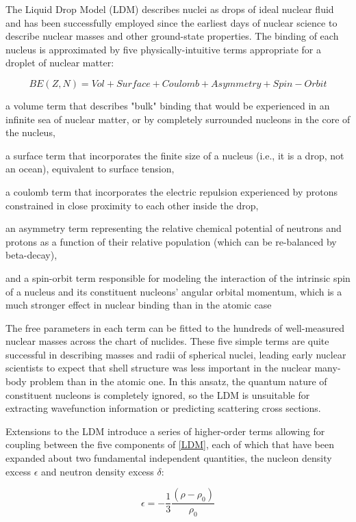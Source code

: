 The Liquid Drop Model (LDM) describes nuclei as drops of ideal nuclear fluid and
has been successfully employed since the earliest days of nuclear science to
describe nuclear masses and other ground-state properties. The binding of each
nucleus is approximated by five physically-intuitive terms appropriate for
a droplet of nuclear matter:

\begin{equation} \label{LDM}
    BE(Z, N) = Vol + Surface + Coulomb + Asymmetry + Spin-Orbit
\end{equation}

a volume term that describes "bulk" binding that would be experienced in an
infinite sea of nuclear matter, or by completely surrounded nucleons in the core of the nucleus,

a surface term that incorporates the finite size of a nucleus (i.e., it is a
drop, not an ocean), equivalent to surface tension,

a coulomb term that incorporates the electric repulsion experienced by protons
constrained in close proximity to each other inside the drop,

an asymmetry term representing the relative chemical potential of neutrons and
protons as a function of their relative population (which can be re-balanced by
beta-decay),

and a spin-orbit term responsible for modeling the interaction of the intrinsic spin
of a nucleus and its constituent nucleons' angular orbital momentum, which is
a much stronger effect in nuclear binding than in the atomic case

The free parameters in each term can be fitted to the hundreds of well-measured nuclear masses
across the chart of nuclides. These five simple terms are quite successful
in describing masses and radii of spherical nuclei, leading early nuclear
scientists to expect that shell structure was less important in the nuclear
many-body problem than in the atomic one. In this ansatz, the quantum
nature of constituent nucleons is completely ignored, so the LDM is  
unsuitable for extracting wavefunction information or predicting scattering
cross sections.

Extensions to the LDM introduce a series of higher-order terms allowing for coupling
between the five components of \ref{LDM}, each of which that have been expanded about two
fundamental independent quantities, the nucleon density excess $\epsilon$
and neutron density excess $\delta$:

\begin{equation}
    \epsilon = -\frac{1}{3}\frac{(\rho - \rho_{0})}{\rho_{0}}
\end{equation}

